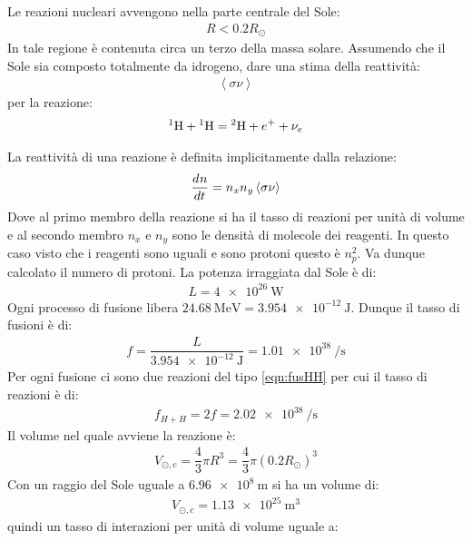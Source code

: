 \documentclass[../main]{subfiles}
\begin{document}
	\begin{ese}[10.2]
	Le reazioni nucleari avvengono nella parte centrale del Sole:
	\begin{gather}
	R<0.2R_{\odot}
	\end{gather}
	In tale regione è contenuta circa un terzo della massa solare. Assumendo che il Sole sia composto totalmente da idrogeno, dare una stima della reattività:
	\begin{gather*}
	\left<\sigma\nu\right> 
	\end{gather*}
	per la reazione:
	\begin{gather}
	\label{eqn:fusHH}
	\chem{^{1}H}+\chem{^{1}H}=\chem{^{2}H}+e^{+}+\nu_{e}
	\end{gather}
\end{ese}
\begin{svol}
	La reattività di una reazione è definita implicitamente dalla relazione:
	\begin{gather}
		\der[]{n}{t}=n_{x}n_{y}\left<\sigma\nu\right> 
	\end{gather}
	Dove al primo membro della reazione si ha il tasso di reazioni per unità di volume e al secondo membro $ n_{x} $ e $ n_{y} $ sono le densità di molecole dei reagenti. In questo caso visto che i reagenti sono uguali e sono protoni questo è $ n_{p}^{2} $. Va dunque calcolato il numero di protoni. La potenza irraggiata dal Sole è di:
	\begin{gather*}
	L=\SI{4e26}{\watt}
	\end{gather*}
	Ogni processo di fusione libera $ \SI{24.68}{\mega\electronvolt}=	\SI{3.954e-12}{\joule} $. Dunque il tasso di fusioni è di:
	\begin{gather*}
	f=\dfrac{L}{\SI{3.954e-12}{\joule}}=\SI{1.01e38}{\per\second}
	\end{gather*}
	Per ogni fusione ci sono due reazioni del tipo \ref{eqn:fusHH} per cui il tasso di reazioni è di:
	\begin{gather}
		f_{H+H}=2f=\SI{2.02e38}{\per\second}
	\end{gather}
	Il volume nel quale avviene la reazione è:
	\begin{gather}
		V_{\odot,c}=\dfrac{4}{3}\pi R^{3}=\dfrac{4}{3}\pi (0.2R_{\odot})^{3}
	\end{gather}
	Con un raggio del Sole uguale a $ \SI{6.96e8}{\meter} $ si ha un volume di:
	\begin{gather}
		V_{\odot,c}=\SI{1.13e25}{\meter\cubed}
	\end{gather}
	quindi un tasso di interazioni per unità di volume uguale a:

\end{svol}
\end{document}
